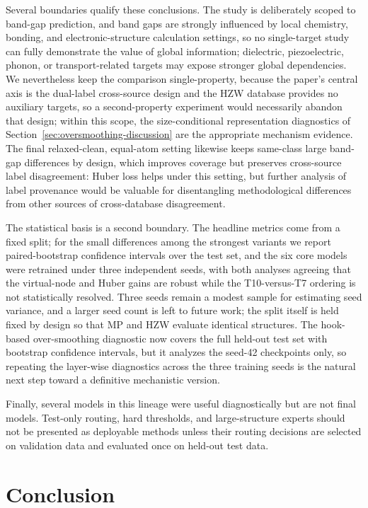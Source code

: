 \documentclass[a4paper,11pt]{article}
\begin{document}
Several boundaries qualify these conclusions. The study is deliberately scoped to band-gap prediction, and band gaps are strongly influenced by local chemistry, bonding, and electronic-structure calculation settings, so no single-target study can fully demonstrate the value of global information; dielectric, piezoelectric, phonon, or transport-related targets may expose stronger global dependencies. We nevertheless keep the comparison single-property, because the paper's central axis is the dual-label cross-source design and the HZW database provides no auxiliary targets, so a second-property experiment would necessarily abandon that design; within this scope, the size-conditional representation diagnostics of Section~\ref{sec:oversmoothing-discussion} are the appropriate mechanism evidence. The final relaxed-clean, equal-atom setting likewise keeps same-class large band-gap differences by design, which improves coverage but preserves cross-source label disagreement: Huber loss helps under this setting, but further analysis of label provenance would be valuable for disentangling methodological differences from other sources of cross-database disagreement.

The statistical basis is a second boundary. The headline metrics come from a fixed split; for the small differences among the strongest variants we report paired-bootstrap confidence intervals over the test set, and the six core models were retrained under three independent seeds, with both analyses agreeing that the virtual-node and Huber gains are robust while the T10-versus-T7 ordering is not statistically resolved. Three seeds remain a modest sample for estimating seed variance, and a larger seed count is left to future work; the split itself is held fixed by design so that MP and HZW evaluate identical structures. The hook-based over-smoothing diagnostic now covers the full held-out test set with bootstrap confidence intervals, but it analyzes the seed-42 checkpoints only, so repeating the layer-wise diagnostics across the three training seeds is the natural next step toward a definitive mechanistic version.

Finally, several models in this lineage were useful diagnostically but are not final models. Test-only routing, hard thresholds, and large-structure experts should not be presented as deployable methods unless their routing decisions are selected on validation data and evaluated once on held-out test data.

\section{Conclusion}
\end{document}
